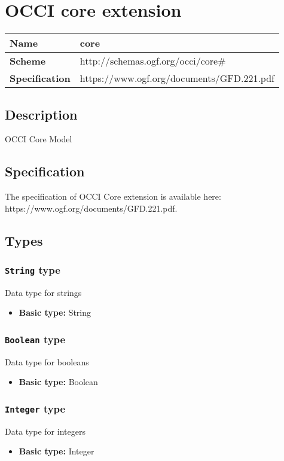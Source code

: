 \section{OCCI core extension}
\begin{center}
\begin{tabular}{|l|l|}
  \hline
  \textbf{Name} & core \\
  \hline  
  \textbf{Scheme} & http://schemas.ogf.org/occi/core\# \\
  \hline
  \textbf{Specification} & https://www.ogf.org/documents/GFD.221.pdf \\
  \hline
\end{tabular}
\end{center}

\subsection{Description}
OCCI Core Model


\subsection{Specification}
The specification of OCCI Core extension is available here: https://www.ogf.org/documents/GFD.221.pdf.
\subsection{Types}
\subsubsection{\texttt{String} type}
Data type for strings
\begin{itemize}
\item \textbf{Basic type:} String
\end{itemize}
\subsubsection{\texttt{Boolean} type}
Data type for booleans
\begin{itemize}
\item \textbf{Basic type:} Boolean
\end{itemize}
\subsubsection{\texttt{Integer} type}
Data type for integers
\begin{itemize}
\item \textbf{Basic type:} Integer
\end{itemize}
